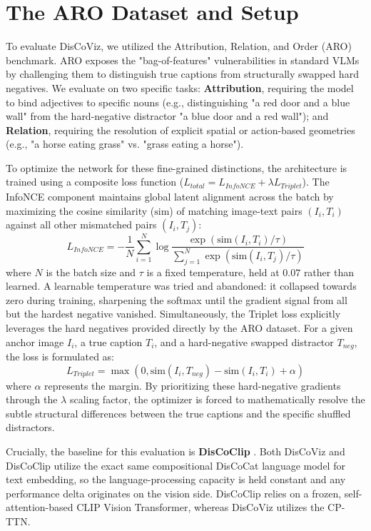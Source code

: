 \documentclass[12pt, a4paper, oneside]{report}
\begin{document}
\section{The ARO Dataset and Setup}

To evaluate DisCoViz, we utilized the Attribution, Relation, and Order (ARO) benchmark. ARO exposes the "bag-of-features" vulnerabilities in standard VLMs by challenging them to distinguish true captions from structurally swapped hard negatives. We evaluate on two specific tasks: \textbf{Attribution}, requiring the model to bind adjectives to specific nouns (e.g., distinguishing "a red door and a blue wall" from the hard-negative distractor "a blue door and a red wall"); and \textbf{Relation}, requiring the resolution of explicit spatial or action-based geometries (e.g., "a horse eating grass" vs. "grass eating a horse").


To optimize the network for these fine-grained distinctions, the architecture is trained using a composite loss function ($L_{total} = L_{InfoNCE} + \lambda L_{Triplet}$). The InfoNCE component maintains global latent alignment across the batch by maximizing the cosine similarity ($\text{sim}$) of matching image-text pairs $(I_i, T_i)$ against all other mismatched pairs $(I_i, T_j)$:
\begin{equation}
    L_{InfoNCE} = - \frac{1}{N} \sum_{i=1}^N \log \frac{\exp(\text{sim}(I_i, T_i) / \tau)}{\sum_{j=1}^N \exp(\text{sim}(I_i, T_j) / \tau)}
\end{equation}
where $N$ is the batch size and $\tau$ is a fixed temperature, held at $0.07$ rather than learned. A learnable temperature was tried and abandoned: it collapsed towards zero during training, sharpening the softmax until the gradient signal from all but the hardest negative vanished.
Simultaneously, the Triplet loss explicitly leverages the hard negatives provided directly by the ARO dataset. For a given anchor image $I_i$, a true caption $T_i$, and a hard-negative swapped distractor $T_{neg}$, the loss is formulated as:
\begin{equation}
    L_{Triplet} = \max(0, \text{sim}(I_i, T_{neg}) - \text{sim}(I_i, T_i) + \alpha)
\end{equation}
where $\alpha$ represents the margin. By prioritizing these hard-negative gradients through the $\lambda$ scaling factor, the optimizer is forced to mathematically resolve the subtle structural differences between the true captions and the specific shuffled distractors.

Crucially, the baseline for this evaluation is \textbf{DisCoClip} \cite{discoclip}. Both DisCoViz and DisCoClip utilize the exact same compositional DisCoCat language model for text embedding, so the language-processing capacity is held constant and any performance delta originates on the vision side. DisCoClip relies on a frozen, self-attention-based CLIP Vision Transformer, whereas DisCoViz utilizes the CP-TTN.
\end{document}
